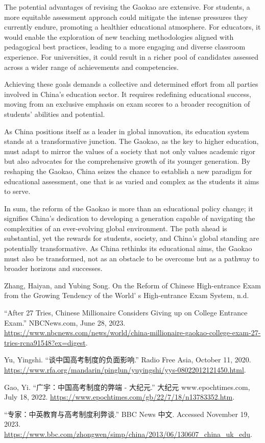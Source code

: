 \documentclass[11pt]{article}
\begin{document}
The potential advantages of revising the Gaokao are extensive. For students, a more equitable assessment approach could mitigate the intense pressures they currently endure, promoting a healthier educational atmosphere. For educators, it would enable the exploration of new teaching methodologies aligned with pedagogical best practices, leading to a more engaging and diverse classroom experience. For universities, it could result in a richer pool of candidates assessed across a wider range of achievements and competencies.

Achieving these goals demands a collective and determined effort from all parties involved in China's education sector. It requires redefining educational success, moving from an exclusive emphasis on exam scores to a broader recognition of students' abilities and potential.

As China positions itself as a leader in global innovation, its education system stands at a transformative junction. The Gaokao, as the key to higher education, must adapt to mirror the values of a society that not only values academic rigor but also advocates for the comprehensive growth of its younger generation. By reshaping the Gaokao, China seizes the chance to establish a new paradigm for educational assessment, one that is as varied and complex as the students it aims to serve.

In sum, the reform of the Gaokao is more than an educational policy change; it signifies China's dedication to developing a generation capable of navigating the complexities of an ever-evolving global environment. The path ahead is substantial, yet the rewards for students, society, and China's global standing are potentially transformative. As China rethinks its educational aims, the Gaokao must also be transformed, not as an obstacle to be overcome but as a pathway to broader horizons and successes.

\begin{references}[Reference]
\item Zhang, Haiyan, and Yubing Song. On the Reform of Chinese High-entrance Exam from the Growing Tendency of the World’ s High-entrance Exam System, n.d.
\item “After 27 Tries, Chinese Millionaire Considers Giving up on College Entrance Exam.” NBCNews.com, June 28, 2023. \url{https://www.nbcnews.com/news/world/china-millionaire-gaokao-college-exam-27-tries-rcna91548?ex=digest}.
\item Yu, Yingshi. “谈中国高考制度的负面影响.” Radio Free Asia, October 11, 2020. \url{https://www.rfa.org/mandarin/pinglun/yuyingshi/yys-08022012121450.html}.
\item Gao, Yi. “广宇：中国高考制度的弊端 - 大纪元.” 大纪元 www.epochtimes.com, July 18, 2022. \url{https://www.epochtimes.com/gb/22/7/18/n13783352.htm}.
\item “专家：中英教育与高考制度利弊谈.” BBC News 中文. Accessed November 19, 2023. \url{https://www.bbc.com/zhongwen/simp/china/2013/06/130607_china_uk_edu}.
\end{references}
\end{document}
